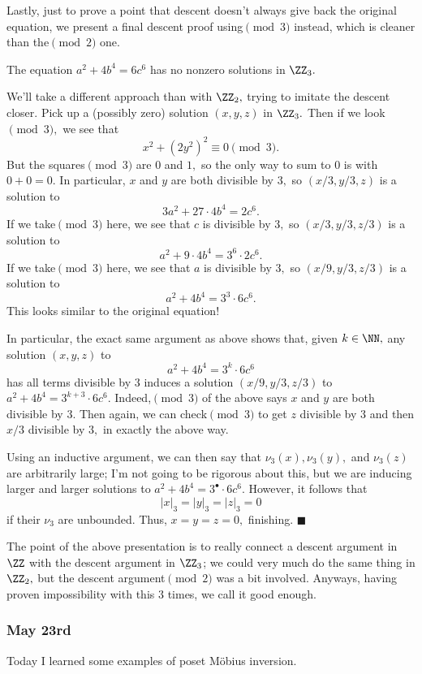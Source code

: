 Lastly, just to prove a point that descent doesn't always give back the original equation, we present a final descent proof using$\pmod3$ instead, which is cleaner than the$\pmod2$ one.
\begin{lemma}
    The equation $a^2+4b^4=6c^6$ has no nonzero solutions in $\ZZ_3.$
\end{lemma}
We'll take a different approach than with $\ZZ_2,$ trying to imitate the descent closer. Pick up a (possibly zero) solution $(x,y,z)$ in $\ZZ_3.$ Then if we look$\pmod3,$ we see that
\[x^2+\left(2y^2\right)^2\equiv0\pmod3.\]
But the squares$\pmod3$ are $0$ and $1,$ so the only way to sum to $0$ is with $0+0=0.$ In particular, $x$ and $y$ are both divisible by $3,$ so $(x/3,y/3,z)$ is a solution to
\[3a^2+27\cdot4b^4=2c^6.\]
If we take$\pmod3$ here, we see that $c$ is divisible by $3,$ so $(x/3,y/3,z/3)$ is a solution to
\[a^2+9\cdot4b^4=3^6\cdot2c^6.\]
If we take$\pmod3$ here, we see that $a$ is divisible by $3,$ so $(x/9,y/3,z/3)$ is a solution to
\[a^2+4b^4=3^3\cdot6c^6.\]
This looks similar to the original equation!

In particular, the exact same argument as above shows that, given $k\in\NN,$ any solution $(x,y,z)$ to
\[a^2+4b^4=3^k\cdot6c^6\]
has all terms divisible by $3$ induces a solution $(x/9,y/3,z/3)$ to $a^2+4b^4=3^{k+3}\cdot6c^6.$ Indeed,$\pmod3$ of the above says $x$ and $y$ are both divisible by $3.$ Then again, we can check$\pmod3$ to get $z$ divisible by $3$ and then $x/3$ divisible by $3,$ in exactly the above way.

Using an inductive argument, we can then say that $\nu_3(x),\nu_3(y),$ and $\nu_3(z)$ are arbitrarily large; I'm not going to be rigorous about this, but we are inducing larger and larger solutions to $a^2+4b^4=3^\bullet\cdot6c^6.$ However, it follows that
\[|x|_3=|y|_3=|z|_3=0\]
if their $\nu_3$ are unbounded. Thus, $x=y=z=0,$ finishing. $\blacksquare$

The point of the above presentation is to really connect a descent argument in $\ZZ$ with the descent argument in $\ZZ_3$; we could very much do the same thing in $\ZZ_2,$ but the descent argument$\pmod2$ was a bit involved. Anyways, having proven impossibility with this $3$ times, we call it good enough.

\subsubsection{May 23rd}
Today I learned some examples of poset M\"obius inversion.\todo{}

